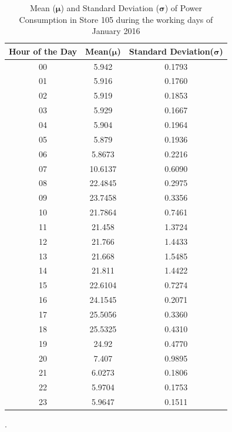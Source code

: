 \documentclass[12pt]{article}
\begin{document}
\begin{table}[H]
	\centering
	{\renewcommand{\arraystretch}{1.0} 
		\begin{tabular}{|c|c|c|}
			\hline %
			Hour of the Day & Mean($\mathbf{\mu}$) & Standard Deviation($\mathbf{\sigma}$)\\
			\hline	%
			00 & 5.942
			 & 0.1793
			  \\ \hline  %
			01 & 5.916 & 0.1760 \\ \hline %
			02 & 5.919 & 0.1853\\  \hline  %
			03 & 5.929 &0.1667 \\ 
			\hline	%
			04 & 5.904 & 0.1964 \\ \hline  %
			05 & 5.879 & 0.1936 \\ \hline %
			06 & 5.8673 & 0.2216\\  \hline  %
			07 & 10.6137 &0.6090 \\ 
			\hline	%
			08 & 22.4845 &0.2975 \\ 
			\hline	%
			09 & 23.7458 & 0.3356 \\ \hline  %
			10 &21.7864 & 0.7461\\ \hline %
			11 & 21.458 &1.3724 \\  \hline  %
			12 & 21.766 &1.4433 \\ 
			\hline	%
			13 &21.668 & 1.5485 \\ \hline %
			14 & 21.811 &1.4422 \\  \hline  %
			15 & 22.6104 & 0.7274\\ 
			\hline	%
			16 &24.1545 & 0.2071 \\ \hline %
			17 & 25.5056 & 0.3360\\  \hline  %
			18 & 25.5325 &0.4310 \\ \hline
			19 & 24.92 & 0.4770 \\ \hline %
			20 & 7.407  & 0.9895\\  \hline  %
			21 & 6.0273 &0.1806 \\ 
			\hline	%
			22 &5.9704 & 0.1753 \\ \hline %
			23 & 5.9647 & 0.1511\\  \hline  %
		\end{tabular}
}
\caption{Mean ($\mathbf{\mu}$) and Standard Deviation ($\mathbf{\sigma}$) of Power Consumption in Store 105 during the working days of January 2016}.
\label{table:studies}
\end{table}
\end{document}
